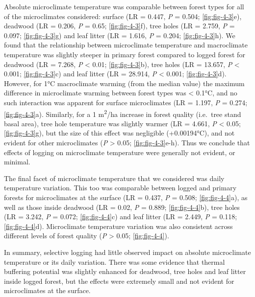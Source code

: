 \documentclass[12pt,a4paper,]{report}
\theoremstyle{definition}
\theoremstyle{definition}
\theoremstyle{definition}
\theoremstyle{remark}
\begin{document}
Absolute microclimate temperature was comparable between forest types
for all of the microclimates considered: surface (LR = 0.447, \emph{P} =
0.504; \autoref{fig:fig-4-3}e), deadwood (LR = 0.206, \emph{P} = 0.65;
\autoref{fig:fig-4-3}f), tree holes (LR = 2.759, \emph{P} = 0.097;
\autoref{fig:fig-4-3}g) and leaf litter (LR = 1.616, \emph{P} = 0.204;
\autoref{fig:fig-4-3}h). We found that the relationship between
microclimate temperature and macroclimate temperature was slightly
steeper in primary forest compared to logged forest for deadwood (LR =
7.268, \emph{P} \textless{} 0.01; \autoref{fig:fig-4-3}b), tree holes
(LR = 13.657, \emph{P} \textless{} 0.001; \autoref{fig:fig-4-3}c) and
leaf litter (LR = 28.914, \emph{P} \textless{} 0.001;
\autoref{fig:fig-4-3}d). However, for 1°C macroclimate warming (from the
median value) the maximum difference in microclimate warming between
forest types was \textless{} 0.1°C, and no such interaction was apparent
for surface microclimates (LR = 1.197, \emph{P} = 0.274;
\autoref{fig:fig-4-3}a). Similarly, for a 1 m\textsuperscript{2}/ha
increase in forest quality (i.e.~tree stand basal area), tree hole
temperature was slightly warmer (LR = 4.661, \emph{P} \textless{} 0.05;
\autoref{fig:fig-4-3}g), but the size of this effect was negligible
(+0.00194°C), and not evident for other microclimates (\emph{P}
\textgreater{} 0.05; \autoref{fig:fig-4-3}e-h). Thus we conclude that
effects of logging on microclimate temperature were generally not
evident, or minimal.

The final facet of microclimate temperature that we considered was daily
temperature variation. This too was comparable between logged and
primary forests for microclimates at the surface (LR = 0.437, \emph{P} =
0.508; \autoref{fig:fig-4-4}a), as well as those inside deadwood (LR =
0.02, \emph{P} = 0.889; \autoref{fig:fig-4-4}b), tree holes (LR = 3.242,
\emph{P} = 0.072; \autoref{fig:fig-4-4}c) and leaf litter (LR = 2.449,
\emph{P} = 0.118; \autoref{fig:fig-4-4}d). Microclimate temperature
variation was also consistent across different levels of forest quality
(\emph{P} \textgreater{} 0.05; \autoref{fig:fig-4-4}).

In summary, selective logging had little observed impact on absolute
microclimate temperature or its daily variation. There was some evidence
that thermal buffering potential was slightly enhanced for deadwood,
tree holes and leaf litter inside logged forest, but the effects were
extremely small and not evident for microclimates at the surface.
\end{document}
